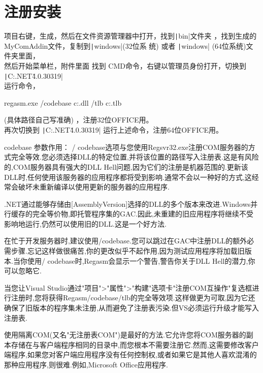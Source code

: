 \documentclass[math,code]{amznotes}
\begin{document}
	\section{注册安装}
	项目右键，生成，然后在文件资源管理器中打开，找到\texttt|bin\Debug|文件夹 ，找到生成的MyComAddin文件，复制到\texttt|windows|(32位系
	统) 或者 \texttt|windows| (64位系统)文件夹里面，\\	
	然后开始菜单栏，附件里面 找到 CMD命令，右键以管理员身份打开，切换到\\ \texttt|C:\Windows\Microsoft.NET\Framework\v4.0.30319| \\
	运行命令，
	\begin{TermWin}[Width=13cm,Title={},Align=flush left]{}
regasm.exe /codebase c:\windows{}\MyComAddin.dll /tlb c:\windows{}\MyComAddin.tlb 
	\end{TermWin}
	(具体路径自己写准确) ，注册32位OFFICE用。\\
	再次切换到 \texttt|C:\Windows\Microsoft.NET\v4.0.30319| 运行上述命令，注册64位OFFICE用。
	\begin{notebox}
		codebase 参数作用\cite{RegAsm_codebase}：
		/ codebase选项与您使用Regsvr32.exe注册COM服务器的方式完全等效.您必须选择DLL的特定位置,并将该位置的路径写入注册表.这是有风险的,COM服务器具有强大的DLL Hell问题,因为它们的注册是机器范围的.更新该DLL时,任何使用该服务器的应用程序都将受到影响.通常不会以一种好的方式,这经常会破坏未重新编译以使用更新的服务器的应用程序.
		
		.NET通过能够存储由[AssemblyVersion]选择的DLL的多个版本来改进.Windows并行缓存的完全等价物,即托管程序集的GAC.因此,未重建的旧应用程序将继续不受影响地运行,仍然可以使用旧的DLL.这是一个好方法.
		
		在忙于开发服务器时,建议使用/codebase.您可以跳过在GAC中注册DLL的额外必需步骤.忘记这样做很痛苦,你的更改似乎不起作用\cite{comAddin_LoadFailure,VSTO_comAddin_LoadFailure},因为测试应用程序将加载旧版本.当你使用/ codebase时,Regasm会显示一个警告,警告你关于DLL Hell的潜力,你可以忽略它.
		
		当您让Visual Studio通过"项目">"属性">"构建"选项卡"注册COM互操作"复选框进行注册时,您将获得Regasm/codebase/tlb的完全等效项.这样做更为可取,因为它还确保了旧版本的程序集未注册,从而避免了注册表污染.但VS必须运行升级才能写入注册表.
		
		使用隔离COM(又名"无注册表COM")是最好的方法.它允许您将COM服务器的副本存储在与客户端程序相同的目录中,而您根本不需要注册它.然而,这需要修改客户端程序,如果您对客户端应用程序没有任何控制权,或者如果它是其他人喜欢混淆的那种应用程序,则很难.例如,Microsoft Office应用程序.
	\end{notebox}
\end{document}
